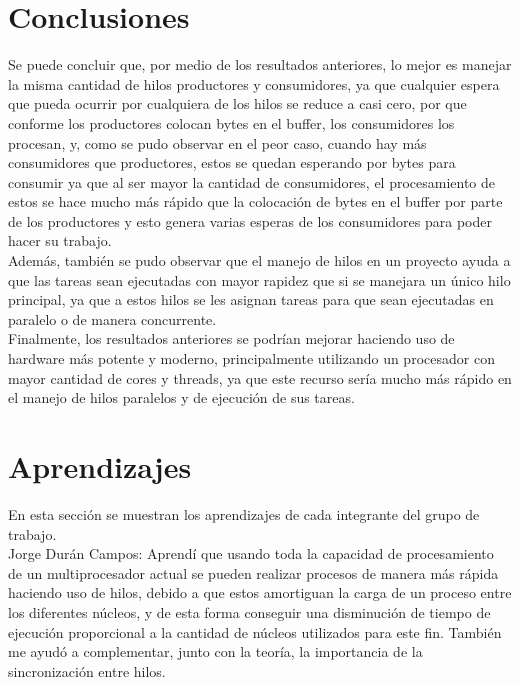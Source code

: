 \documentclass[12pt, article, natbib]{IEEEtran}
\begin{document}
\section{Conclusiones}
Se puede concluir que, por medio de los resultados anteriores, lo mejor es manejar la misma cantidad de hilos productores y consumidores, ya que cualquier espera que pueda ocurrir por cualquiera de los hilos se reduce a casi cero, por que conforme los productores colocan bytes en el buffer, los consumidores los procesan, y, como se pudo observar en el peor caso, cuando hay más consumidores que productores, estos se quedan esperando por bytes para consumir ya que al ser mayor la cantidad de consumidores, el procesamiento de estos se hace mucho más rápido que la colocación de bytes en el buffer por parte de los productores y esto genera varias esperas de los consumidores para poder hacer su trabajo.\\

Además, también se pudo observar que el manejo de hilos en un proyecto ayuda a que las tareas sean ejecutadas con mayor rapidez que si se manejara un único hilo principal, ya que a estos hilos se les asignan tareas para que sean ejecutadas en paralelo o de manera concurrente.\cite{portfoliocourses_2022_introduction} \\

Finalmente, los resultados anteriores se podrían mejorar haciendo uso de hardware más potente y moderno, principalmente utilizando un procesador con mayor cantidad de cores y threads, ya que este recurso sería mucho más rápido en el manejo de hilos paralelos y de ejecución de sus tareas.\\

\section{Aprendizajes}
En esta sección se muestran los aprendizajes de cada integrante del grupo de trabajo.\\

Jorge Durán Campos: Aprendí que usando toda la capacidad de procesamiento de un multiprocesador actual se pueden realizar procesos de manera más rápida haciendo uso de hilos, debido a que estos amortiguan la carga de un proceso entre los diferentes núcleos, y de esta forma conseguir una disminución de tiempo de ejecución proporcional a la cantidad de núcleos utilizados para este fin. También me ayudó a complementar, junto con la teoría, la importancia de la sincronización entre hilos.\\
\end{document}
